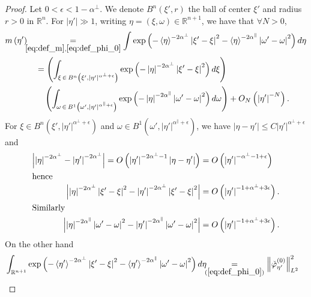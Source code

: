 \documentclass[AHL,Unicode,longabstracts,published]{cedram}
\newcommand*\eq[1]{\underset{(#1)}{=}}
\newcommand{\bbR}{\mathbb{R}}
\let\oldforall\forall
\renewcommand*{\forall}{\mathrel{\oldforall}}
\newcommand{\bbR}{\mathbb{R}}
\begin{document}
\begin{proof}
Let $0<\epsilon<1-\alpha^{\perp}$. We denote $B^{n}(\xi',r)$ the ball of center $\xi'$ and radius $r>0$ in $\bbR^{n}$. For $|\eta'|\gg1$, writing $\eta=(\xi,\omega)\in\bbR^{n+1}$, we have that $\forall N>0$,
\begin{align}\label{eq:expression_m}
m\left(\eta'\right)\quad & \mkern-27mu\underset{{\eqref{eq:def_m},\eqref{eq:def_phi_0}}}{=}\int\exp\left(-\left\langle \eta\right\rangle ^{-2\alpha^{\perp}}\left|\xi'-\xi\right|^{2}-\left\langle \eta\right\rangle ^{-2\alpha^{\parallel}}\left|\omega'-\omega\right|^{2}\right)d\eta
\\
& =\left(\int_{\xi\,\in\,B^{n}\left(\xi',\left|\eta'\right|^{\alpha^{\perp}+\epsilon}\right)}\exp\left(-\left|\eta\right|^{-2\alpha^{\perp}}\left|\xi'-\xi\right|^{2}\right)d\xi\right)\nonumber \\
& \quad\left(\int_{\omega\,\in\,B^{1}\left(\omega',\left|\eta'\right|^{\alpha^{\parallel}+\epsilon}\right)}\exp\left(-\left|\eta\right|^{-2\alpha^{\parallel}}\left|\omega'-\omega\right|^{2}\right)d\omega\right)+O_{N}\left(\left|\eta'\right|^{-N}\right).
\end{align}
For $\xi\in B^{n}(\xi',|\eta'|^{\alpha^{\perp}+\epsilon})$ and $\omega\in B^{1}(\omega',|\eta'|^{\alpha^{\parallel}+\epsilon})$, we have $|\eta-\eta'|\leq C|\eta'|^{\alpha^{\perp}+\epsilon}$ and
\begin{align*}
\left|\left|\eta\right|^{-2\alpha^{\perp}}-\left|\eta'\right|^{-2\alpha^{\perp}}\right|=O\left(\left|\eta'\right|^{-2\alpha^{\perp}-1}\left|\eta-\eta'\right|\right) &=O\left(\left|\eta'\right|^{-\alpha^{\perp}-1+\epsilon}\right)
\\
\intertext{hence}
\left|\left|\eta\right|^{-2\alpha^{\perp}}\left|\xi'-\xi\right|^{2}-\left|\eta'\right|^{-2\alpha^{\perp}}\left|\xi'-\xi\right|^{2}\right| &=O\left(\left|\eta'\right|^{-1+\alpha^{\perp}+3\epsilon}\right).
\\
\intertext{Similarly}
\left|\left|\eta\right|^{-2\alpha^{\parallel}}\left|\omega'-\omega\right|^{2}-\left|\eta'\right|^{-2\alpha^{\parallel}}\left|\omega'-\omega\right|^{2}\right| &=O\left(\left|\eta'\right|^{-1+\alpha^{\perp}+3\epsilon}\right).
\end{align*}
On the other hand
\begin{align*}
\mkern-15mu\int_{\bbR^{n+1}}\exp\left(-\left\langle \eta'\right\rangle ^{-2\alpha^{\perp}}\left|\xi'-\xi\right|^{2}-\left\langle \eta'\right\rangle ^{-2\alpha^{\parallel}}\left|\omega'-\omega\right|^{2}\right)d\eta &\!\!\!\eq{\ref{eq:def_phi_0}}\left\Vert \check{\varphi}_{\eta'}^{\left(0\right)}\right\Vert _{L^{2}}^{2}\\

\end{align*}
\end{proof}
\end{document}

